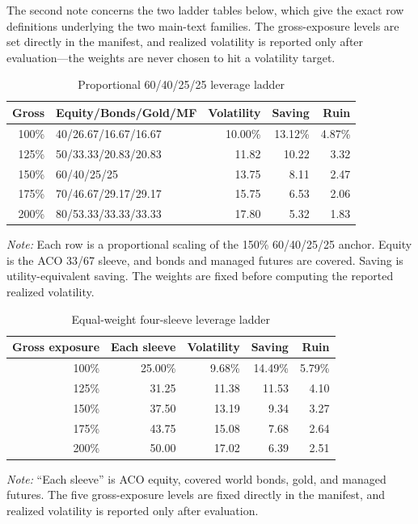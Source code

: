 \documentclass[11pt]{article}
\begin{document}
The second note concerns the two ladder tables below, which give the exact row
definitions underlying the two main-text families. The gross-exposure levels
are set directly in the manifest, and realized volatility is reported only
after evaluation---the weights are never chosen to hit a volatility target.

\begin{table}[H]
\centering
\caption{Proportional 60/40/25/25 leverage ladder}
\label{tab:60402525-ladder}
\small
\begin{tabular}{rlrrr}
\toprule
Gross & Equity/Bonds/Gold/MF & Volatility & Saving & Ruin \\
\midrule
100\% & 40/26.67/16.67/16.67 & 10.00\% & 13.12\% & 4.87\% \\
125\% & 50/33.33/20.83/20.83 & 11.82 & 10.22 & 3.32 \\
150\% & 60/40/25/25 & 13.75 & 8.11 & 2.47 \\
175\% & 70/46.67/29.17/29.17 & 15.75 & 6.53 & 2.06 \\
200\% & 80/53.33/33.33/33.33 & 17.80 & 5.32 & 1.83 \\
\bottomrule
\end{tabular}
\begin{minipage}{0.96\textwidth}\footnotesize
\textit{Note:} Each row is a proportional scaling of the 150\% 60/40/25/25
anchor. Equity is the ACO 33/67 sleeve, and bonds and managed futures are
covered. Saving is utility-equivalent saving. The weights are fixed before
computing the reported realized volatility.
\end{minipage}
\end{table}

\begin{table}[H]
\centering
\caption{Equal-weight four-sleeve leverage ladder}
\label{tab:equal-ladder}
\begin{tabular}{rrrrr}
\toprule
Gross exposure & Each sleeve & Volatility & Saving & Ruin \\
\midrule
100\% & 25.00\% & 9.68\% & 14.49\% & 5.79\% \\
125\% & 31.25 & 11.38 & 11.53 & 4.10 \\
150\% & 37.50 & 13.19 & 9.34 & 3.27 \\
175\% & 43.75 & 15.08 & 7.68 & 2.64 \\
200\% & 50.00 & 17.02 & 6.39 & 2.51 \\
\bottomrule
\end{tabular}
\begin{minipage}{0.96\textwidth}\footnotesize
\textit{Note:} ``Each sleeve'' is ACO equity, covered world bonds, gold, and
managed futures. The five gross-exposure levels are fixed directly in the
manifest, and realized volatility is reported only after evaluation.
\end{minipage}
\end{table}
\end{document}
